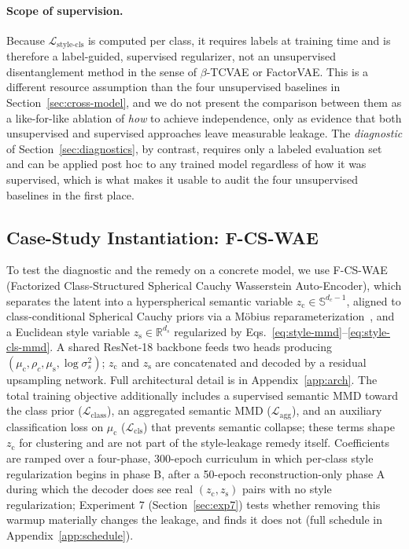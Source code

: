 \documentclass[10pt,letterpaper]{article}
\newcommand{\ours}{F-CS-WAE}
\newcommand{\zc}{z_{\mathrm{c}}}
\newcommand{\zs}{z_{\mathrm{s}}}
\newcommand{\muc}{\mu_{\mathrm{c}}}
\newcommand{\mus}{\mu_{\mathrm{s}}}
\newcommand{\Sph}{\mathbb{S}}
\newcommand{\R}{\mathbb{R}}
\begin{document}
\paragraph{Scope of supervision.}
Because $\mathcal{L}_{\mathrm{style\text{-}cls}}$ is computed per class, it
requires labels at training time and is therefore a label-guided,
supervised regularizer, not an unsupervised disentanglement method in the
sense of $\beta$-TCVAE or FactorVAE. This is a different resource
assumption than the four unsupervised baselines in
Section~\ref{sec:cross-model}, and we do not present the comparison between
them as a like-for-like ablation of \emph{how} to achieve independence, only
as evidence that both unsupervised and supervised approaches leave
measurable leakage. The \emph{diagnostic} of Section~\ref{sec:diagnostics},
by contrast, requires only a labeled evaluation set and can be applied
post hoc to any trained model regardless of how it was supervised, which is
what makes it usable to audit the four unsupervised baselines in the first
place.

\subsection{Case-Study Instantiation: \ours{}}
\label{sec:instantiation}

To test the diagnostic and the remedy on a concrete model, we use \ours{}
(Factorized Class-Structured Spherical Cauchy Wasserstein Auto-Encoder),
which separates the latent into a hyperspherical semantic variable
$\zc\in\Sph^{d_c-1}$, aligned to class-conditional Spherical Cauchy priors
via a M\"obius reparameterization~\citep{sablica2025hyperspherical}, and a
Euclidean style variable $\zs\in\R^{d_s}$ regularized by
Eqs.~\ref{eq:style-mmd}--\ref{eq:style-cls-mmd}. A shared ResNet-18
backbone feeds two heads producing $(\muc,\rho_c,\mus,\log\sigma_s^2)$;
$\zc$ and $\zs$ are concatenated and decoded by a residual upsampling
network. Full architectural detail is in Appendix~\ref{app:arch}. The total
training objective additionally includes a supervised semantic MMD toward
the class prior ($\mathcal{L}_{\mathrm{class}}$), an aggregated semantic MMD
($\mathcal{L}_{\mathrm{agg}}$), and an auxiliary classification loss on
$\muc$ ($\mathcal{L}_{\mathrm{cls}}$) that prevents semantic collapse; these
terms shape $\zc$ for clustering and are not part of the style-leakage
remedy itself. Coefficients are ramped over a four-phase, 300-epoch
curriculum in which per-class style regularization begins in phase B, after
a 50-epoch reconstruction-only phase A during which the decoder does see
real $(\zc,\zs)$ pairs with no style regularization; Experiment 7
(Section~\ref{sec:exp7}) tests whether removing this warmup materially
changes the leakage, and finds it does not (full schedule in
Appendix~\ref{app:schedule}).
\end{document}
